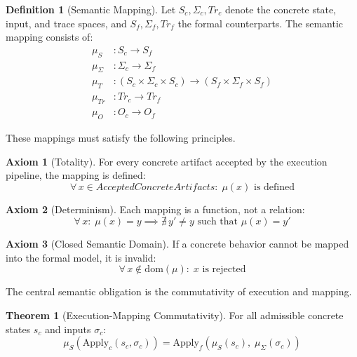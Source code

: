 \documentclass[11pt,a4paper]{article}
\theoremstyle{definition}
\newtheorem{definition}{Definition}[section]
\newtheorem{theorem}{Theorem}[section]
\newtheorem{axiom}{Axiom}[section]
\newcommand{\Apply}{\mathrm{Apply}}
\begin{document}
\begin{definition}[Semantic Mapping]
\label{def:semantic-mapping}
Let $S_c, \Sigma_c, \mathit{Tr}_c$ denote the concrete state, input, and trace spaces, and $S_f, \Sigma_f, \mathit{Tr}_f$ the formal counterparts. The semantic mapping consists of:
\begin{align}
\mu_S &: S_c \to S_f \\
\mu_\Sigma &: \Sigma_c \to \Sigma_f \\
\mu_T &: (S_c \times \Sigma_c \times S_c) \to (S_f \times \Sigma_f \times S_f) \\
\mu_{\mathit{Tr}} &: \mathit{Tr}_c \to \mathit{Tr}_f \\
\mu_O &: O_c \to O_f
\end{align}
\end{definition}

These mappings must satisfy the following principles.

\begin{axiom}[Totality]
\label{ax:totality}
For every concrete artifact accepted by the execution pipeline, the mapping is defined:
\begin{equation}
\forall\, x \in \mathit{AcceptedConcreteArtifacts}:\; \mu(x) \text{ is defined}
\end{equation}
\end{axiom}

\begin{axiom}[Determinism]
\label{ax:mapping-determinism}
Each mapping is a function, not a relation:
\begin{equation}
\forall\, x:\; \mu(x) = y \implies \nexists\, y' \neq y \text{ such that } \mu(x) = y'
\end{equation}
\end{axiom}

\begin{axiom}[Closed Semantic Domain]
\label{ax:closed-domain}
If a concrete behavior cannot be mapped into the formal model, it is invalid:
\begin{equation}
\forall\, x \notin \mathrm{dom}(\mu):\; x \text{ is rejected}
\end{equation}
\end{axiom}

The central semantic obligation is the commutativity of execution and mapping.

\begin{theorem}[Execution-Mapping Commutativity]
\label{thm:commutativity}
For all admissible concrete states $s_c$ and inputs $\sigma_c$:
\begin{equation}
\label{eq:commutativity}
\mu_S(\Apply_c(s_c, \sigma_c)) = \Apply_f(\mu_S(s_c),\; \mu_\Sigma(\sigma_c))
\end{equation}
\end{theorem}
\end{document}
